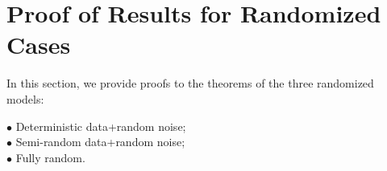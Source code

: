 \documentclass[twoside,11pt]{article}
\numberwithin{equation}{section}
\begin{document}



\section{Proof of  Results for Randomized Cases}\label{sec:proof_randomized}
In this section, we provide proofs to the theorems of the three randomized models:
\begin{description}
  \item[$\bullet$ Deterministic data+random noise;]
  \item[$\bullet$ Semi-random data+random noise;]
  \item[$\bullet$ Fully random.]
\end{description}
\end{document}
